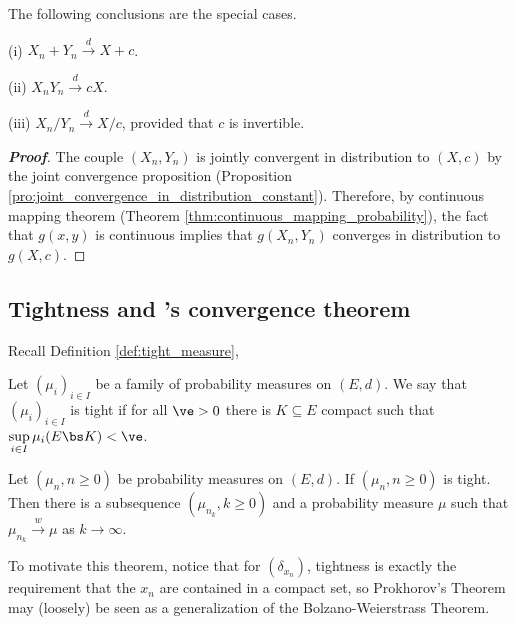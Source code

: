 \begin{remark}
The following conclusions are the special cases.
\ben
\item [(i)] $X_n + Y_n \stackrel{d}{\to} X+c$.
\item [(ii)] $X_nY_n \stackrel{d}{\to} cX$.
\item [(iii)] $X_n/Y_n \stackrel{d}{\to} X/c$, provided that $c$ is invertible.
\een
\end{remark}

\begin{proof}[\bf Proof]
The couple $(X_n,Y_n)$ is jointly convergent in distribution to $(X,c)$ by the joint convergence proposition (Proposition \ref{pro:joint_convergence_in_distribution_constant}). Therefore, by continuous mapping theorem (Theorem \ref{thm:continuous_mapping_probability}), the fact that $g(x,y)$ is continuous implies that $g(X_n,Y_n)$ converges in distribution to $g(X,c)$.
\end{proof}





\subsection{Tightness and \levy's convergence theorem}

Recall Definition \ref{def:tight_measure},

\begin{definition}\label{def:tight_probability}
Let $(\mu_i)_{i\in I}$ be a family of probability measures on $(E, d)$. We say that $(\mu_i)_{i\in I}$ is tight if for all $\ve > 0$ there is $K \subseteq E$ compact such that $\sup\limits_{i\in I} \mu_i(E \bs K) < \ve$.
\end{definition}

\begin{theorem}\label{thm:prokhorov_probability}
Let $(\mu_n, n \geq 0)$ be probability measures on $(E, d)$. %
If $(\mu_n, n \geq 0)$ is tight. Then there is a subsequence $(\mu_{n_k} , k \geq 0)$ and a probability measure $\mu$ such that $\mu_{n_k} \stackrel{w}{\to} \mu$ as $k \to \infty$.
\end{theorem}

To motivate this theorem, notice that for $(\delta_{x_n})$, tightness is exactly the requirement that the $x_n$ are contained in a compact set, so Prokhorov's Theorem may (loosely) be seen as a generalization of the Bolzano-Weierstrass Theorem.


